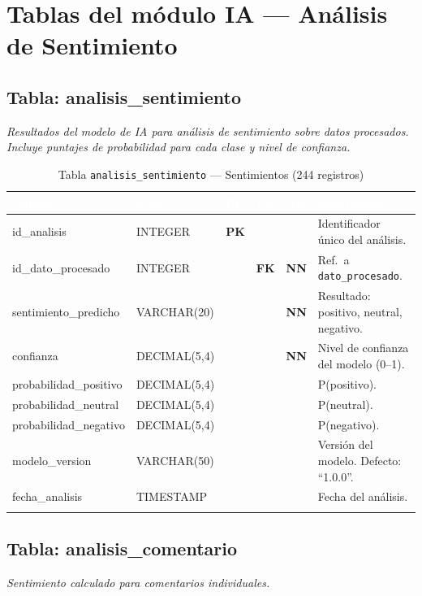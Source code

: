\documentclass[11pt,a4paper]{article}
\newcommand{\tableheadrow}{\rowcolor{tableheader}}
\newcommand{\tablehead}[1]{\textcolor{white}{\textbf{#1}}}
\newcommand{\pk}{\textcolor{emiblue}{\textbf{PK}}}
\newcommand{\fk}{\textcolor{orange!80!black}{\textbf{FK}}}
\newcommand{\nn}{\textcolor{red!70!black}{\textbf{NN}}}
\begin{document}
\section{Tablas del módulo IA — Análisis de Sentimiento}

\subsection{Tabla: analisis\_sentimiento}
\textit{Resultados del modelo de IA para análisis de sentimiento sobre datos procesados. Incluye puntajes de probabilidad para cada clase y nivel de confianza.}

\begin{longtable}{p{4.2cm} p{2.8cm} c c c p{4.5cm}}
\toprule
\tableheadrow
\tablehead{Campo} & \tablehead{Tipo} & \tablehead{PK} & \tablehead{FK} & \tablehead{NN} & \tablehead{Descripción} \\
\midrule
\endhead
id\_analisis & INTEGER & \pk & & & Identificador único del análisis. \\
\rowcolor{tablerow}
id\_dato\_procesado & INTEGER & & \fk & \nn & Ref.\ a \texttt{dato\_procesado}. \\
sentimiento\_predicho & VARCHAR(20) & & & \nn & Resultado: positivo, neutral, negativo. \\
\rowcolor{tablerow}
confianza & DECIMAL(5,4) & & & \nn & Nivel de confianza del modelo (0--1). \\
probabilidad\_positivo & DECIMAL(5,4) & & & & P(positivo). \\
\rowcolor{tablerow}
probabilidad\_neutral & DECIMAL(5,4) & & & & P(neutral). \\
probabilidad\_negativo & DECIMAL(5,4) & & & & P(negativo). \\
\rowcolor{tablerow}
modelo\_version & VARCHAR(50) & & & & Versión del modelo. Defecto: ``1.0.0''. \\
fecha\_analisis & TIMESTAMP & & & & Fecha del análisis. \\
\bottomrule
\caption{Tabla \texttt{analisis\_sentimiento} — Sentimientos (244 registros)}
\end{longtable}

\subsection{Tabla: analisis\_comentario}
\textit{Sentimiento calculado para comentarios individuales.}
\end{document}
